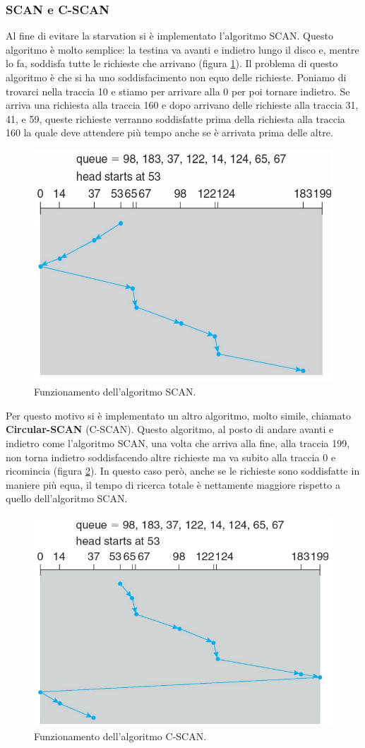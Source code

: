 \subsubsection{SCAN e C-SCAN}\label{scan}
Al fine di evitare la starvation si è implementato l'algoritmo SCAN. Questo algoritmo è molto semplice: la testina va avanti e indietro lungo il disco e, mentre lo fa, soddisfa tutte le richieste che arrivano (figura \ref{fig:SCAN}). Il problema di questo algoritmo è che si ha uno soddisfacimento non equo delle richieste. Poniamo di trovarci nella traccia 10 e stiamo per arrivare alla 0 per poi tornare indietro. Se arriva una richiesta alla traccia 160 e dopo arrivano delle richieste alla traccia 31, 41, e 59, queste richieste verranno soddisfatte prima della richiesta alla traccia 160 la quale deve attendere più tempo anche se è arrivata prima delle altre.
\begin{figure}[h]
    \centering
    \includegraphics[width = .5\textwidth]{../res/imgs/mass memory/SCAN.png}
    \caption{Funzionamento dell'algoritmo SCAN.}
    \label{fig:SCAN}
\end{figure}

\noindent Per questo motivo si è implementato un altro algoritmo, molto simile, chiamato \textbf{Circular-SCAN} (C-SCAN). Questo algoritmo, al posto di andare avanti e indietro come l'algoritmo SCAN, una volta che arriva alla fine, alla traccia 199, non torna indietro soddisfacendo altre richieste ma va subito alla traccia 0 e ricomincia (figura \ref{fig:C-SCAN}). In questo caso però, anche se le richieste sono soddisfatte in maniere più equa, il tempo di ricerca totale è nettamente maggiore rispetto a quello dell'algoritmo SCAN.
\begin{figure}[h]
    \centering
    \includegraphics[width = .5\textwidth]{../res/imgs/mass memory/C-SCAN.png}
    \caption{Funzionamento dell'algoritmo C-SCAN.}
    \label{fig:C-SCAN}
\end{figure}

